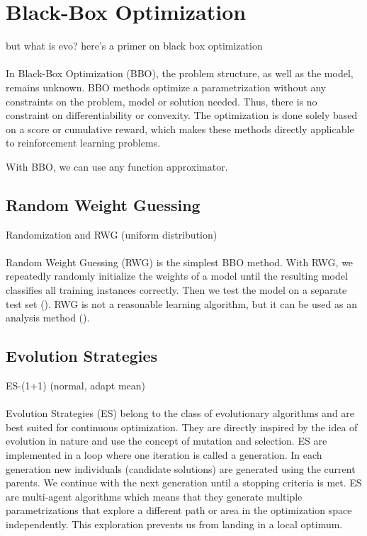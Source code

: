 
\section{Black-Box Optimization}
but what is evo? here's a primer on black box optimization \\ \\
In Black-Box Optimization (BBO), the problem structure, as well as the model, remains unknown. BBO methods optimize a parametrization without any constraints on the problem, model or solution needed. Thus, there is no constraint on differentiability or convexity. The optimization is done solely based on a score or cumulative reward, which makes these methods directly applicable to reinforcement learning problems.

With BBO, we can use any function approximator.

\subsection{Random Weight Guessing}
Randomization and RWG (uniform distribution) \\ \\
Random Weight Guessing (RWG) is the simplest BBO method. With RWG, we repeatedly randomly initialize the weights of a model until the resulting model classifies all training instances correctly. Then we test the model on a separate test set (\cite{schmidhuber2001evaluating}). RWG is not a reasonable learning algorithm, but it can be used as an analysis method (\cite{oller_analyzing_2020}).

\subsection{Evolution Strategies}
ES-(1+1) (normal, adapt mean) \\ \\
Evolution Strategies (ES) belong to the class of evolutionary algorithms and are best suited for continuous optimization. They are directly inspired by the idea of evolution in nature and use the concept of mutation and selection. ES are implemented in a loop where one iteration is called a generation. In each generation new individuals (candidate solutions) are generated using the current parents. We continue with the next generation until a stopping criteria is met. ES are multi-agent algorithms which means that they generate multiple parametrizations that explore a different path or area in the optimization space independently. This exploration prevents us from landing in a local optimum.

